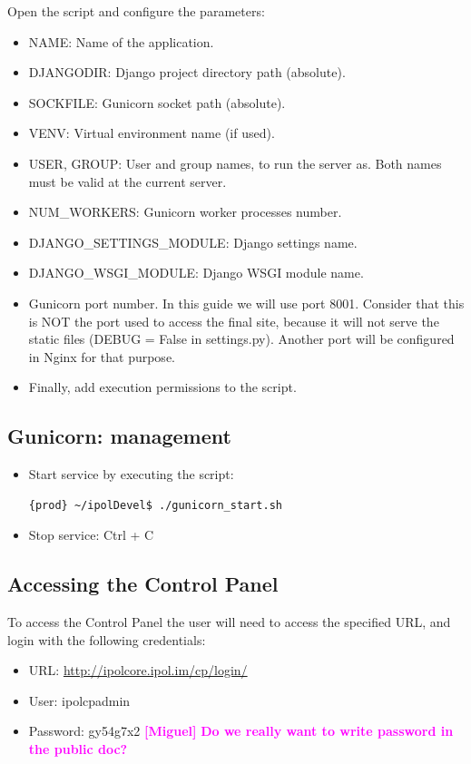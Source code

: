 \documentclass[a4paper,12pt]{article}
\newcommand{\miguel}[1]{\textcolor{magenta}{\textbf{[Miguel]} \textbf{#1}}}
\begin{document}
Open the script and configure the parameters:
\begin{itemize}
\item NAME: Name of the application.
\item DJANGODIR: Django project directory path (absolute).
\item SOCKFILE: Gunicorn socket path (absolute).
\item VENV: Virtual environment name (if used).
\item USER, GROUP: User and group names, to run the server as. Both names must be valid at the current server.
\item NUM\_WORKERS: Gunicorn worker processes number.
\item DJANGO\_SETTINGS\_MODULE: Django settings name.
\item DJANGO\_WSGI\_MODULE: Django WSGI module name.
\item Gunicorn port number. In this guide we will use port 8001. Consider that this is NOT the port used to access the final site, because it will not serve the static files (DEBUG = False in settings.py). Another port will be configured in Nginx for that purpose.
\item Finally, add execution permissions to the script.
\end{itemize}

\subsection{Gunicorn: management}
\begin{itemize}
\item Start service by executing the script:
\begin{lstlisting}[language=Bash]
{prod} ~/ipolDevel$ ./gunicorn_start.sh
\end{lstlisting}

\item Stop service: Ctrl + C
\end{itemize}



\subsection{Accessing the Control Panel}
To access the Control Panel the user will need to access the specified URL, and login with the following credentials:

\begin{itemize}
\item URL: \url{http://ipolcore.ipol.im/cp/login/}

\item User: ipolcpadmin

\item Password: gy54g7x2 \miguel{Do we really want to write password in the public doc?}
\end{itemize}



\end{document}
